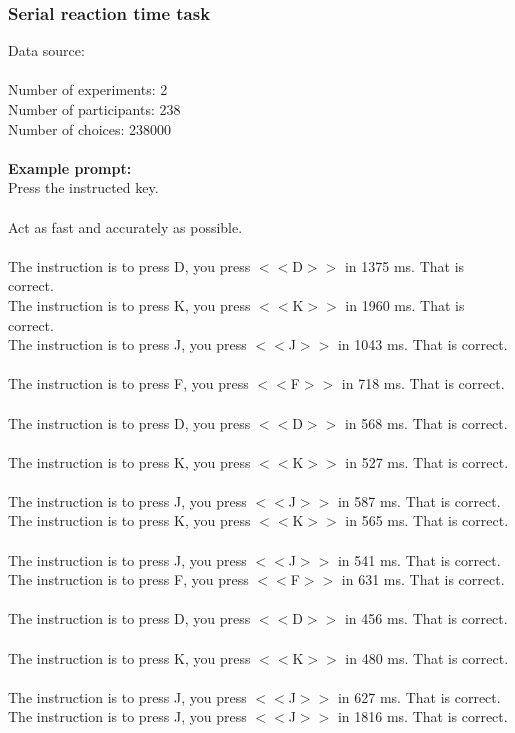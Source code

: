 \documentclass[pdflatex,sn-nature]{sn-jnl}%
\theoremstyle{thmstyleone}%
\theoremstyle{thmstyletwo}%
\theoremstyle{thmstylethree}%
\begin{document}
\subsubsection*{Serial reaction time task}
Data source: \cite{wu2023chunking} \\ $~$ \\
Number of experiments: 2 $~$\\ 
Number of participants: 238 $~$\\ 
Number of choices: 238000 $~$\\ 
 $~$\\ 
\textbf{Example prompt:}
 $~$\\ 
Press the instructed key. $~$\\ 
 $~$\\ 
Act as fast and accurately as possible. $~$\\ 
 $~$\\ 
The instruction is to press D, you press $<<$D$>>$ in 1375 ms. That is correct. $~$\\ 
The instruction is to press K, you press $<<$K$>>$ in 1960 ms. That is correct. $~$\\ 
The instruction is to press J, you press $<<$J$>>$ in 1043 ms. That is correct. $~$\\ 
The instruction is to press F, you press $<<$F$>>$ in 718 ms. That is correct. $~$\\ 
The instruction is to press D, you press $<<$D$>>$ in 568 ms. That is correct. $~$\\ 
The instruction is to press K, you press $<<$K$>>$ in 527 ms. That is correct. $~$\\ 
The instruction is to press J, you press $<<$J$>>$ in 587 ms. That is correct. $~$\\ 
The instruction is to press K, you press $<<$K$>>$ in 565 ms. That is correct. $~$\\ 
The instruction is to press J, you press $<<$J$>>$ in 541 ms. That is correct. $~$\\ 
The instruction is to press F, you press $<<$F$>>$ in 631 ms. That is correct. $~$\\ 
The instruction is to press D, you press $<<$D$>>$ in 456 ms. That is correct. $~$\\ 
The instruction is to press K, you press $<<$K$>>$ in 480 ms. That is correct. $~$\\ 
The instruction is to press J, you press $<<$J$>>$ in 627 ms. That is correct. $~$\\ 
The instruction is to press J, you press $<<$J$>>$ in 1816 ms. That is correct. $~$\\ 
\end{document}
